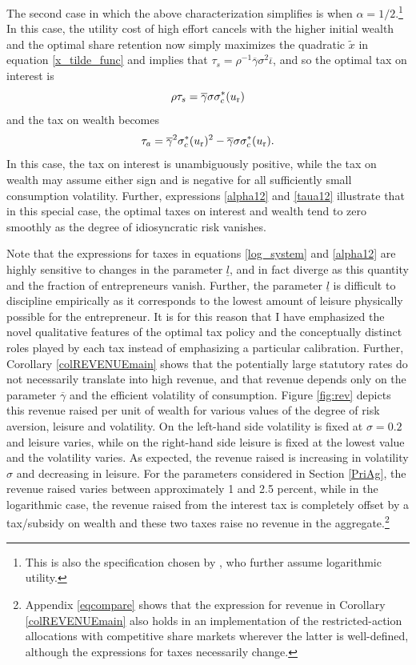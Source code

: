 \documentclass[11pt]{article}
\theoremstyle{plain}
\begin{document}
The second case in which the above characterization simplifies is when $\alpha=1/2$.\footnote{This is also the specification chosen by \cite{jones_schumpeterian_2018}, who further assume logarithmic utility.} In this case, the utility cost of high effort cancels with the higher initial wealth and the optimal share retention now simply maximizes the quadratic $\tilde{x}$ in equation \eqref{x_tilde_func} and implies that $\tau_s = \rho^{-1} \overline{\gamma} \sigma^2 \overline{\iota}$, and so the optimal tax on interest is
\begin{equation} 
\rho \tau_s = \overline{\gamma} \sigma \sigma_c^*(u_{\textnormal{r}})
\label{alpha12}
\end{equation} 
and the tax on wealth becomes
\begin{equation}
\tau_a = \overline{\gamma}^2 \sigma_c^*(u_{\textnormal{r}})^2 - \overline{\gamma} \sigma \sigma_c^*(u_{\textnormal{r}}).
\label{taua12}
\end{equation}
In this case, the tax on interest is unambiguously positive, while the tax on wealth may assume either sign and is negative for all sufficiently small consumption volatility. Further, expressions \eqref{alpha12} and \eqref{taua12} illustrate that in this special case, the optimal taxes on interest and wealth tend to zero smoothly as the degree of idiosyncratic risk vanishes. 

Note that the expressions for taxes in equations \eqref{log_system} and \eqref{alpha12} are highly sensitive to changes in the parameter $\underline{l}$, and in fact diverge as this quantity and the fraction of entrepreneurs vanish. Further, the parameter $\underline{l}$ is difficult to discipline empirically as it corresponds to the lowest amount of leisure physically possible for the entrepreneur. It is for this reason that I have emphasized the novel qualitative features of the optimal tax policy and the conceptually distinct roles played by each tax instead of emphasizing a particular calibration. Further, Corollary \ref{colREVENUEmain} shows that the potentially large statutory rates do not necessarily translate into high revenue, and that revenue depends only on the parameter $\overline{\gamma}$ and the efficient volatility of consumption. Figure \ref{fig:rev} depicts this revenue raised per unit of wealth for various values of the degree of risk aversion, leisure and volatility. On the left-hand side volatility is fixed at $\sigma=0.2$ and leisure varies, while on the right-hand side leisure is fixed at the lowest value and the volatility varies. As expected, the revenue raised is increasing in volatility $\sigma$ and decreasing in leisure. For the parameters considered in Section \ref{PriAg}, the revenue raised varies between approximately 1 and 2.5 percent, while in the logarithmic case, the revenue raised from the interest tax is completely offset by a tax/subsidy on wealth and these two taxes raise no revenue in the aggregate.\footnote{Appendix \ref{eqcompare} shows that the expression for revenue in Corollary \ref{colREVENUEmain} also holds in an implementation of the restricted-action allocations with competitive share markets wherever the latter is well-defined, although the expressions for taxes necessarily change.}
\end{document}
